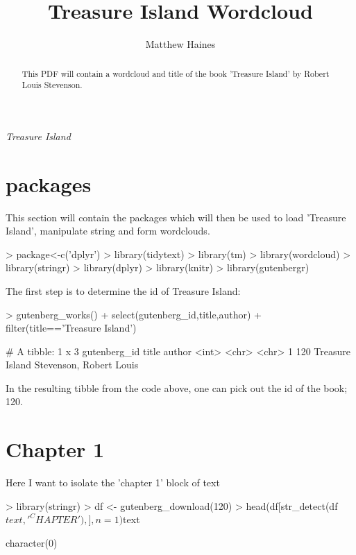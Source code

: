 \documentclass{article}
\begin{document}


\title{Treasure Island Wordcloud}
\author{Matthew Haines}
\maketitle

\begin{abstract}
This PDF will contain a wordcloud and title of the book 'Treasure Island' by Robert Louis Stevenson.

\end{abstract}

\textit{Treasure Island}

\section{packages}
This section will contain the packages which will then be used to load 'Treasure Island', manipulate string and form wordclouds.

\begin{Schunk}
\begin{Sinput}
> package<-c('dplyr')
> library(tidytext)
> library(tm)
> library(wordcloud)
> library(stringr)
> library(dplyr)
> library(knitr)
> library(gutenbergr)
\end{Sinput}
\end{Schunk}

The first step is to determine the id of Treasure Island:

\begin{Schunk}
\begin{Sinput}
> gutenberg_works()%>%
+   select(gutenberg_id,title,author)%>%
+   filter(title=='Treasure Island')
\end{Sinput}
\begin{Soutput}
# A tibble: 1 x 3
  gutenberg_id           title                  author
         <int>           <chr>                   <chr>
1          120 Treasure Island Stevenson, Robert Louis
\end{Soutput}
\end{Schunk}

\noindent In the resulting tibble from the code above, one can pick out the id of the book; 120.

\section{Chapter 1}

Here I want to isolate the 'chapter 1' block of text
\begin{Schunk}
\begin{Sinput}
> library(stringr)
> df <- gutenberg_download(120)
> head(df[str_detect(df$text, '^CHAPTER'),],n=1)$text
\end{Sinput}
\begin{Soutput}
character(0)
\end{Soutput}
\end{Schunk}
\end{document}
